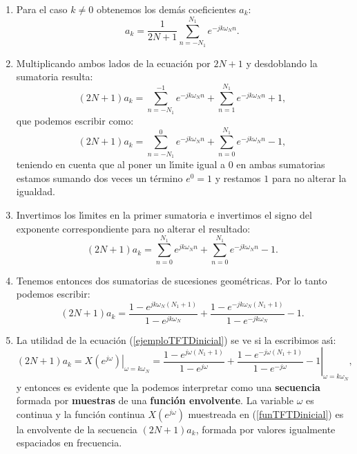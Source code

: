 \begin{enumerate}
	\item Para el caso $k \neq 0$ obtenemos los dem\'{a}s coeficientes $a_{k}$:
	\begin{equation}
		a_{k} = \frac{1}{2N + 1} \sum_{n=-N_{1}}^{N_{1}} e^{-jk\omega_{N}n}.
	\end{equation}
	
	\item Multiplicando ambos lados de la ecuaci\'{o}n por $2N + 1$ y desdoblando la sumatoria resulta:
	\begin{equation}
		(2N + 1) a_{k} = \sum_{n=-N_{1}}^{-1} e^{-jk\omega_{N}n} + \sum_{n=1}^{N_{1}} e^{-jk\omega_{N}n} + 1,
	\end{equation}
	que podemos escribir como:
	\begin{equation}
		(2N + 1) a_{k} = \sum_{n=-N_{1}}^{0} e^{-jk\omega_{N}n} + \sum_{n=0}^{N_{1}} e^{-jk\omega_{N}n} - 1,
	\end{equation}
	teniendo en cuenta que al poner un l\'{\i}mite igual a $0$ en ambas sumatorias estamos sumando dos veces un t\'{e}rmino $e^{0} = 1$ y restamos $1$ para no alterar la igualdad.
	
	\item Invertimos los l\'{\i}mites en la primer sumatoria e invertimos el signo del exponente correspondiente para no alterar el resultado:
	\begin{equation}
		(2N + 1) a_{k} = \sum_{n=0}^{N_{1}} e^{jk\omega_{N}n} + \sum_{n=0}^{N_{1}} e^{-jk\omega_{N}n} - 1.
	\end{equation}
	
	\item Tenemos entonces dos sumatorias de sucesiones geom\'{e}tricas. Por lo tanto podemos escribir:
	\begin{equation}
		(2N + 1) a_{k} = \frac{1 - e^{jk\omega_{N}(N_{1}+1)}}{1 - e^{jk\omega_{N}}} + \frac{1 - e^{-jk\omega_{N}(N_{1}+1)}}{1 - e^{-jk\omega_{N}}} - 1. \label{ejemploTFTDinicial}
	\end{equation}
	
	\item La utilidad de la ecuaci\'{o}n (\ref{ejemploTFTDinicial}) se ve si la escribimos as\'{\i}:
	\begin{equation}
		(2N + 1) a_{k} = \left. X(e^{j\omega}) \right|_{\omega = k\omega_{N}} =
		\left. \frac{1 - e^{j\omega(N_{1}+1)}}{1 - e^{j\omega}} + \frac{1 - e^{-j\omega(N_{1}+1)}}{1 - e^{-j\omega}} - 1 \right|_{\omega=k\omega_{N}},  \label{funTFTDinicial}
	\end{equation}
	y entonces es evidente que la podemos interpretar como una \textbf{secuencia} formada por \textbf{muestras} de una \textbf{funci\'{o}n envolvente}. La variable $\omega$ es continua y la funci\'{o}n continua $X(e^{j\omega})$ muestreada en (\ref{funTFTDinicial}) es la envolvente de la secuencia $(2N+1) a_{k}$, formada por valores igualmente espaciados en frecuencia.
	

\end{enumerate}
